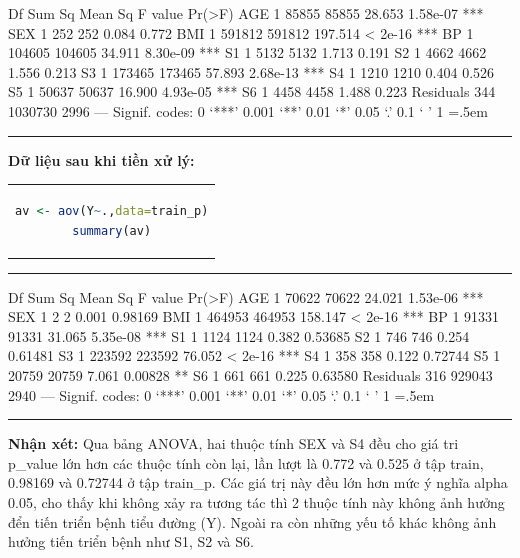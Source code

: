 \documentclass[runningheads]{llncs}
\newenvironment{lcverbatim}
 {\SaveVerbatim{cverb}}
 {\endSaveVerbatim
  \flushleft\fboxrule=0pt\fboxsep=.5em
  \colorbox{cverbbg}{%
    \makebox[\dimexpr\linewidth-2\fboxsep][l]{\BUseVerbatim{cverb}}%
  }
  \endflushleft
}
\begin{document}
\begin{lcverbatim}
          Df  Sum Sq Mean Sq F value   Pr(>F)    
AGE           1   85855   85855  28.653 1.58e-07 ***
SEX           1     252     252   0.084    0.772    
BMI           1  591812  591812 197.514  < 2e-16 ***
BP            1  104605  104605  34.911 8.30e-09 ***
S1            1    5132    5132   1.713    0.191    
S2            1    4662    4662   1.556    0.213    
S3            1  173465  173465  57.893 2.68e-13 ***
S4            1    1210    1210   0.404    0.526    
S5            1   50637   50637  16.900 4.93e-05 ***
S6            1    4458    4458   1.488    0.223    
Residuals   344 1030730    2996                     
---
Signif. codes:  0 ‘***’ 0.001 ‘**’ 0.01 ‘*’ 0.05 ‘.’ 0.1 ‘ ’ 1
\end{lcverbatim}


\hrule
\vspace{0.5cm}

\textbf{Dữ liệu sau khi tiền xử lý:}
\begin{center}
\begin{tabular}{c}
\begin{lstlisting}[language=R]
av <- aov(Y~.,data=train_p)
summary(av)
\end{lstlisting}
\end{tabular}
\end{center}
\hrule
\begin{lcverbatim}
             Df Sum Sq Mean Sq F value   Pr(>F)    
AGE           1  70622   70622  24.021 1.53e-06 ***
SEX           1      2       2   0.001  0.98169    
BMI           1 464953  464953 158.147  < 2e-16 ***
BP            1  91331   91331  31.065 5.35e-08 ***
S1            1   1124    1124   0.382  0.53685    
S2            1    746     746   0.254  0.61481    
S3            1 223592  223592  76.052  < 2e-16 ***
S4            1    358     358   0.122  0.72744    
S5            1  20759   20759   7.061  0.00828 ** 
S6            1    661     661   0.225  0.63580    
Residuals   316 929043    2940                     
---
Signif. codes:  0 ‘***’ 0.001 ‘**’ 0.01 ‘*’ 0.05 ‘.’ 0.1 ‘ ’ 1
\end{lcverbatim}
\hrule
\vspace{0.5cm}

\textbf{Nhận xét:}
Qua bảng ANOVA, hai thuộc tính SEX và S4 đều cho giá tri p\_value lớn hơn các thuộc tính còn lại, lần lượt là 0.772 và 0.525 ở tập train, 0.98169 và 0.72744 ở tập train\_p. Các giá trị này đều lớn hơn mức ý nghĩa alpha 0.05, cho thấy khi không xảy ra tương tác thì 2 thuộc tính này không ảnh hưởng đển tiến triển bệnh tiểu đường (Y). Ngoài ra còn những yếu tố khác không ảnh hưởng tiến triển bệnh như S1, S2 và S6.
\end{document}
